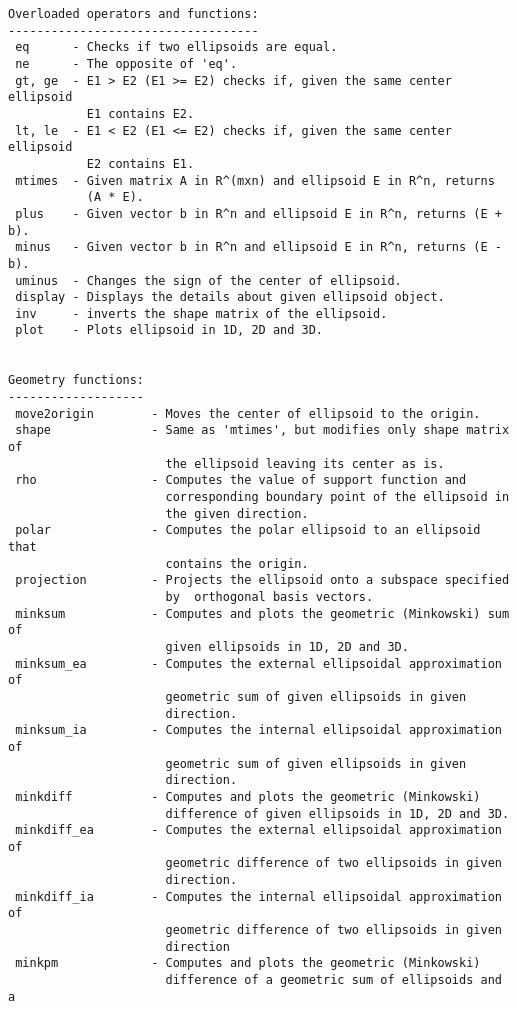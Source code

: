 \begin{enumerate}
\begin{lstlisting}
Overloaded operators and functions:
-----------------------------------
 eq      - Checks if two ellipsoids are equal.
 ne      - The opposite of 'eq'.
 gt, ge  - E1 > E2 (E1 >= E2) checks if, given the same center ellipsoid
           E1 contains E2.
 lt, le  - E1 < E2 (E1 <= E2) checks if, given the same center ellipsoid
           E2 contains E1.
 mtimes  - Given matrix A in R^(mxn) and ellipsoid E in R^n, returns
           (A * E).
 plus    - Given vector b in R^n and ellipsoid E in R^n, returns (E + b).
 minus   - Given vector b in R^n and ellipsoid E in R^n, returns (E - b).
 uminus  - Changes the sign of the center of ellipsoid.
 display - Displays the details about given ellipsoid object.
 inv     - inverts the shape matrix of the ellipsoid.
 plot    - Plots ellipsoid in 1D, 2D and 3D.


Geometry functions:
-------------------
 move2origin        - Moves the center of ellipsoid to the origin.
 shape              - Same as 'mtimes', but modifies only shape matrix of
                      the ellipsoid leaving its center as is.
 rho                - Computes the value of support function and
                      corresponding boundary point of the ellipsoid in
                      the given direction.
 polar              - Computes the polar ellipsoid to an ellipsoid that
                      contains the origin.
 projection         - Projects the ellipsoid onto a subspace specified
                      by  orthogonal basis vectors.
 minksum            - Computes and plots the geometric (Minkowski) sum of
                      given ellipsoids in 1D, 2D and 3D.
 minksum_ea         - Computes the external ellipsoidal approximation of
                      geometric sum of given ellipsoids in given
                      direction.
 minksum_ia         - Computes the internal ellipsoidal approximation of
                      geometric sum of given ellipsoids in given
                      direction.
 minkdiff           - Computes and plots the geometric (Minkowski)
                      difference of given ellipsoids in 1D, 2D and 3D.
 minkdiff_ea        - Computes the external ellipsoidal approximation of
                      geometric difference of two ellipsoids in given
                      direction.
 minkdiff_ia        - Computes the internal ellipsoidal approximation of
                      geometric difference of two ellipsoids in given
                      direction
 minkpm             - Computes and plots the geometric (Minkowski)
                      difference of a geometric sum of ellipsoids and a

\end{lstlisting}
\end{enumerate}
